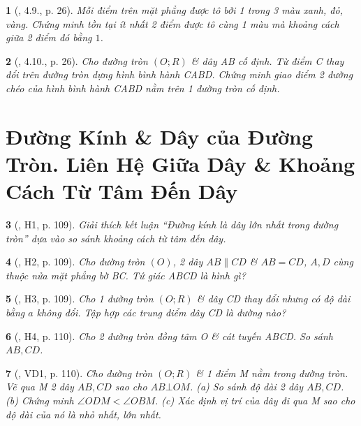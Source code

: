 \documentclass{article}
\newtheorem{baitoan}{}
\begin{document}
\begin{baitoan}[\cite{TLCT_THCS_Toan_9_hinh_hoc}, 4.9., p. 26]
	Mỗi điểm trên mặt phẳng được tô bởi 1 trong 3 màu xanh, đỏ, vàng. Chứng minh tồn tại ít nhất 2 điểm được tô cùng 1 màu mà khoảng cách giữa 2 điểm đó bằng $1$.
\end{baitoan}

\begin{baitoan}[\cite{TLCT_THCS_Toan_9_hinh_hoc}, 4.10., p. 26]
	Cho đường tròn $(O;R)$ \& dây AB cố định. Từ điểm C thay đổi trên đường tròn dựng hình bình hành CABD. Chứng minh giao điểm 2 đường chéo của hình bình hành CABD nằm trên 1 đường tròn cố định.
\end{baitoan}


\section{Đường Kính \& Dây của Đường Tròn. Liên Hệ Giữa Dây \& Khoảng Cách Từ Tâm Đến Dây}

\begin{baitoan}[\cite{Binh_boi_duong_Toan_9_tap_1}, H1, p. 109]
	Giải thích kết luận ``Đường kính là dây lớn nhất trong đường tròn'' dựa vào so sánh khoảng cách từ tâm đến dây.
\end{baitoan}

\begin{baitoan}[\cite{Binh_boi_duong_Toan_9_tap_1}, H2, p. 109]
	Cho đường tròn $(O)$, 2 dây $AB\parallel CD$ \& $AB = CD$, $A,D$ cùng thuộc nửa mặt phẳng bờ BC. Tứ giác ABCD là hình gì?
\end{baitoan}

\begin{baitoan}[\cite{Binh_boi_duong_Toan_9_tap_1}, H3, p. 109]
	Cho 1 đường tròn $(O;R)$ \& dây CD thay đổi nhưng có độ dài bằng $a$ không đổi. Tập hợp các trung điểm dây CD là đường nào?
\end{baitoan}

\begin{baitoan}[\cite{Binh_boi_duong_Toan_9_tap_1}, H4, p. 110]
	Cho 2 đường tròn đồng tâm O \& cát tuyến ABCD. So sánh $AB,CD$.
\end{baitoan}

\begin{baitoan}[\cite{Binh_boi_duong_Toan_9_tap_1}, VD1, p. 110]
	Cho đường tròn $(O;R)$ \& 1 điểm M nằm trong đường tròn. Vẽ qua M 2 dây $AB,CD$ sao cho $AB\bot OM$. (a) So sánh độ dài 2 dây $AB,CD$. (b) Chứng minh $\angle{ODM} < \angle{OBM}$. (c) Xác định vị trí của dây đi qua M sao cho độ dài của nó là nhỏ nhất, lớn nhất.
\end{baitoan}
\end{document}
